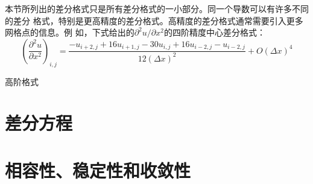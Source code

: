 本节所列出的差分格式只是所有差分格式的一小部分。同一个导数可以有许多不同的差分
格式，特别是更高精度的差分格式。高精度的差分格式通常需要引入更多网格点的信息。例
如，下式给出的$\partial^{2} u/\partial x^{2}$的四阶精度中心差分格式：
\begin{equation}
  \left(
    \frac{\partial^{2} u}{\partial x^{2}}
  \right)_{i,j}
  =
  \frac{-u_{i+2,j}+16u_{i+1,j}-30u_{i,j}+16u_{i-2,j}-u_{i-2,j}}{12(\Delta x)^{2}}
  +
  O(\Delta x)^{4}
\end{equation}

高阶格式

\section{差分方程}
\section{相容性、稳定性和收敛性}

